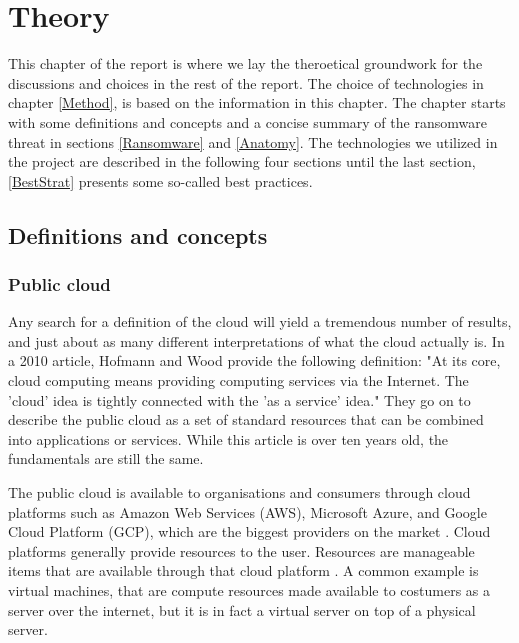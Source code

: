 \chapter{Theory}

This chapter of the report is where we lay the theroetical groundwork for the discussions and choices in the rest of the report. The choice of technologies in chapter \ref{Method}, is based on the information in this chapter. The chapter starts with some definitions and concepts and a concise summary of the ransomware threat in sections \ref{Ransomware} and \ref{Anatomy}. The technologies we utilized in the project are described in the following four sections until the last section, \ref{BestStrat} presents some so-called best practices. 

\section{Definitions and concepts}

\subsection{Public cloud}
Any search for a definition of the cloud will yield a tremendous number of results,
and just about as many different interpretations of what the cloud actually is.
In a 2010 article, Hofmann and Wood \cite{hofmann_cloud_2010} provide the following definition:
"At its core, cloud computing means providing computing services via the Internet.
The 'cloud' idea is tightly connected with the 'as a service' idea."
They go on to describe the public cloud as a set of standard resources that can be combined into applications or services. While this article is over ten years old, the fundamentals are still the same. 

The public cloud  is available to organisations and consumers through cloud platforms such as Amazon Web Services (AWS), Microsoft Azure, and Google Cloud Platform (GCP), which are the biggest providers on the market \cite{richter_amazon_2022}. Cloud platforms generally provide resources to the user. Resources are manageable items that are available through that cloud platform \cite{tfitzmac_azure_nodate}. A common example is virtual machines, that are compute resources made available to costumers as a server over the internet, but it is in fact a virtual server on top of a physical server.

